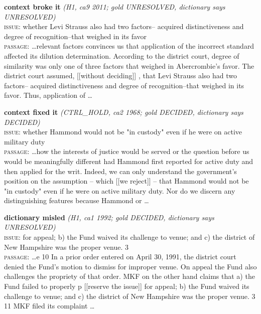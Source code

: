 \textbf{context broke it} \emph{(H1, ca9 2011; gold UNRESOLVED, dictionary says UNRESOLVED)}\\
\textsc{issue}: whether Levi Strauss also had two factors-- acquired distinctiveness and degree of recognition--that weighed in its favor\\
\textsc{passage}: \dots relevant factors convinces us that application of the incorrect standard affected its dilution determination. According to the district court, degree of similarity was only one of three factors that weighed in Abercrombie's favor. The district court assumed, [[without deciding]] , that Levi Strauss also had two factors-- acquired distinctiveness and degree of recognition--that weighed in its favor. Thus, application of \dots
\smallskip

\textbf{context fixed it} \emph{(CTRL\_HOLD, ca2 1968; gold DECIDED, dictionary says DECIDED)}\\
\textsc{issue}: whether Hammond would not be "in custody" even if he were on active military duty\\
\textsc{passage}: \dots how the interests of justice would be served or the question before us would be meaningfully different had Hammond first reported for active duty and then applied for the writ. Indeed, we can only understand the government's position on the assumption -- which [[we reject]] -- that Hammond would not be "in custody" even if he were on active military duty. Nor do we discern any distinguishing features because Hammond or \dots
\smallskip

\textbf{dictionary misled} \emph{(H1, ca1 1992; gold DECIDED, dictionary says UNRESOLVED)}\\
\textsc{issue}: for appeal; b) the Fund waived its challenge to venue; and c) the district of New Hampshire was the proper venue. 3\\
\textsc{passage}: \dots e 10 In a prior order entered on April 30, 1991, the district court denied the Fund's motion to dismiss for improper venue. On appeal the Fund also challenges the propriety of that order. MKF on the other hand claims that a) the Fund failed to properly p [[reserve the issue]] for appeal; b) the Fund waived its challenge to venue; and c) the district of New Hampshire was the proper venue. 3 11 MKF filed its complaint  \dots
\smallskip
